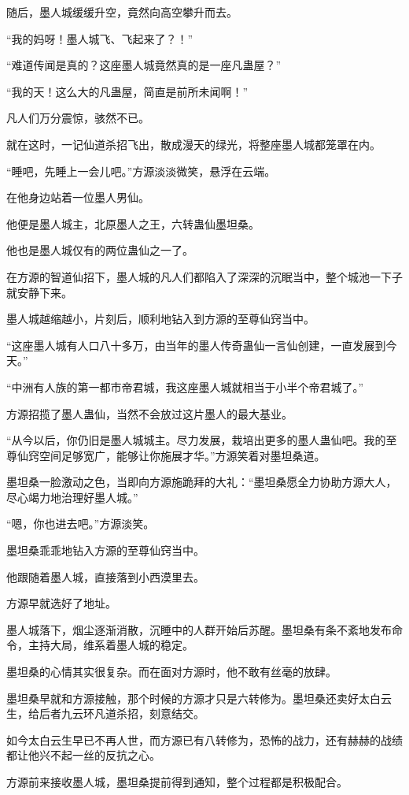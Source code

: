 \begin{this_body}
随后，墨人城缓缓升空，竟然向高空攀升而去。

“我的妈呀！墨人城飞、飞起来了？！”

“难道传闻是真的？这座墨人城竟然真的是一座凡蛊屋？”

“我的天！这么大的凡蛊屋，简直是前所未闻啊！”

凡人们万分震惊，骇然不已。

就在这时，一记仙道杀招飞出，散成漫天的绿光，将整座墨人城都笼罩在内。

“睡吧，先睡上一会儿吧。”方源淡淡微笑，悬浮在云端。

在他身边站着一位墨人男仙。

他便是墨人城主，北原墨人之王，六转蛊仙墨坦桑。

他也是墨人城仅有的两位蛊仙之一了。

在方源的智道仙招下，墨人城的凡人们都陷入了深深的沉眠当中，整个城池一下子就安静下来。

墨人城越缩越小，片刻后，顺利地钻入到方源的至尊仙窍当中。

“这座墨人城有人口八十多万，由当年的墨人传奇蛊仙一言仙创建，一直发展到今天。”

“中洲有人族的第一都市帝君城，我这座墨人城就相当于小半个帝君城了。”

方源招揽了墨人蛊仙，当然不会放过这片墨人的最大基业。

“从今以后，你仍旧是墨人城城主。尽力发展，栽培出更多的墨人蛊仙吧。我的至尊仙窍空间足够宽广，能够让你施展才华。”方源笑着对墨坦桑道。

墨坦桑一脸激动之色，当即向方源施跪拜的大礼：“墨坦桑愿全力协助方源大人，尽心竭力地治理好墨人城。”

“嗯，你也进去吧。”方源淡笑。

墨坦桑乖乖地钻入方源的至尊仙窍当中。

他跟随着墨人城，直接落到小西漠里去。

方源早就选好了地址。

墨人城落下，烟尘逐渐消散，沉睡中的人群开始后苏醒。墨坦桑有条不紊地发布命令，主持大局，维系着墨人城的稳定。

墨坦桑的心情其实很复杂。而在面对方源时，他不敢有丝毫的放肆。

墨坦桑早就和方源接触，那个时候的方源才只是六转修为。墨坦桑还卖好太白云生，给后者九云环凡道杀招，刻意结交。

如今太白云生早已不再人世，而方源已有八转修为，恐怖的战力，还有赫赫的战绩都让他兴不起一丝的反抗之心。

方源前来接收墨人城，墨坦桑提前得到通知，整个过程都是积极配合。


\end{this_body}
